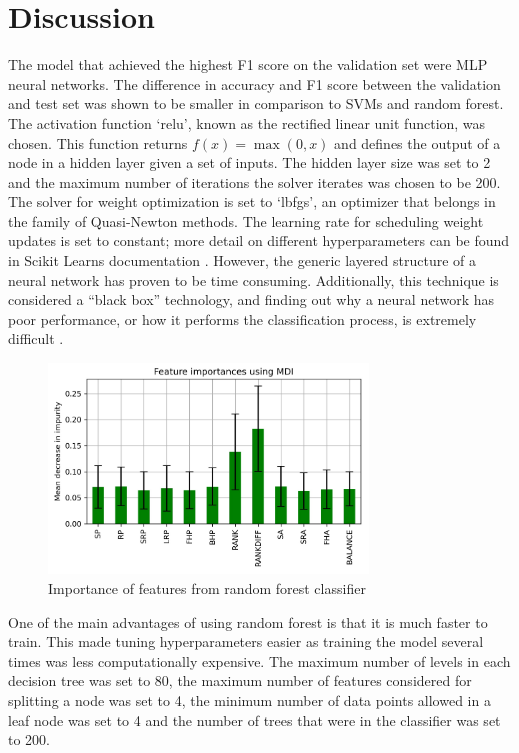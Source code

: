\section{Discussion} \label{discussion}
The model that achieved the highest F1 score on the validation set were MLP neural networks. The difference in accuracy and F1 score between the validation and test set was shown to be smaller in comparison to SVMs and random forest.
The activation function `relu', known as the rectified linear unit function, was chosen. This function returns $f(x) = \max{(0,x)}$ and defines the output of a node in a hidden layer given a set of inputs. The hidden layer size was set to 2 and the maximum number of iterations the solver iterates was chosen to be 200. The solver for weight optimization is set to `lbfgs', an optimizer that belongs in the family of Quasi-Newton methods. The learning rate for scheduling weight updates is set to constant; more detail on different hyperparameters can be found in Scikit Learns documentation \cite{pedregosa2011scikit}. However, the generic layered structure of a neural network has proven to be time consuming. Additionally, this technique is considered a ``black box'' technology, and finding out why a neural network has poor performance, or how it performs the classification process, is extremely difficult \cite{noriega2005multilayer}.

\begin{figure}[ht]
\vspace{-1em}
\includegraphics[width=8.5cm]{plots/feature_importance.pdf}
\caption{Importance of features from random forest classifier}
\vspace{-1em}
\label{fig4}
\centering
\end{figure}

One of the main advantages of using random forest is that it is much faster to train. This made tuning hyperparameters easier as training the model several times was less computationally expensive. The maximum number of levels in each decision tree was set to 80, the maximum number of features considered for splitting a node was set to 4, the minimum number of data points allowed in a leaf node was set to 4 and the number of trees that were in the classifier was set to 200.

